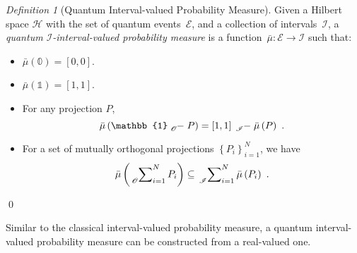 \documentclass{article}
\theoremstyle{remark}
\newtheorem{definition}{Definition}
\newcommand{\events}{\ensuremath{\mathcal{E}}}
\newcommand{\Hilb}{\mathcal{H}}
\begin{document}
\begin{definition}[Quantum Interval-valued Probability Measure]\label{def:QuantumInterval-valuedProbability}
Given a Hilbert space $\Hilb$ with the set of quantum events~$\events$,
and a collection of intervals~$\mathscr{I}$, a \emph{quantum $\mathscr{I}$-interval-valued
probability measure} is a function~$\bar{\mu}:\events\rightarrow\mathscr{I}$
such that: 
\begin{itemize}
\item $\bar{\mu}(\mathbb{0})=\left[0,0\right]$. 
\item $\bar{\mu}(\mathbb{1})=\left[1,1\right]$. 
\item For any projection $P$, 
\begin{equation}
\bar{\mu}\left(\mathbb{1}\tensor*[_{\mathscr{O}}]{-}{}P\right)=\left[1,1\right]\tensor*[_{\mathscr{I}}]{-}{}\bar{\mu}\left(P\right)\textrm{ .}\label{eq:QuantumInterval-valuedProbability-Complement}
\end{equation}
\item For a set of mutually orthogonal projections $\left\{ P_{i}\right\} _{i=1}^{N}$,
we have 
\begin{equation}
\bar{\mu}\left(\sideset{_{\mathscr{O}}}{_{i=1}^{N}}\sum P_{i}\right)\subseteq\sideset{_{\mathscr{I}}}{_{i=1}^{N}}\sum\bar{\mu}\left(P_{i}\right)\textrm{ .}\label{eq:QuantumInterval-valuedProbability-Inclusion}
\end{equation}
\end{itemize}
\qed\end{definition}

Similar to the classical interval-valued probability measure, a quantum
interval-valued probability measure can be constructed from a real-valued
one. 
\end{document}
